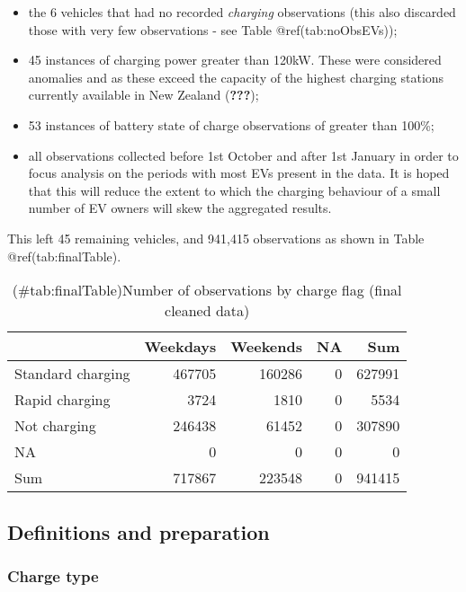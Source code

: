 \documentclass[]{article}
\providecommand{\tightlist}{%
  \setlength{\itemsep}{0pt}\setlength{\parskip}{0pt}}
\begin{document}
\begin{itemize}
\tightlist
\item
  the 6 vehicles that had no recorded \emph{charging} observations (this also discarded those with very few observations - see Table @ref(tab:noObsEVs));
\item
  45 instances of charging power greater than 120kW. These were considered anomalies and as these exceed the capacity of the highest charging stations currently available in New Zealand ({\textbf{???}});
\item
  53 instances of battery state of charge observations of greater than 100\%;
\item
  all observations collected before 1st October and after 1st January in order to focus analysis on the periods with most EVs present in the data. It is hoped that this will reduce the extent to which the charging behaviour of a small number of EV owners will skew the aggregated results.
\end{itemize}

This left 45 remaining vehicles, and 941,415 observations as shown in Table @ref(tab:finalTable).

\begin{table}[t]

\caption{(\#tab:finalTable)Number of observations by charge flag (final cleaned data)}
\centering
\begin{tabular}{l|r|r|r|r}
\hline
  & Weekdays & Weekends & NA & Sum\\
\hline
Standard charging & 467705 & 160286 & 0 & 627991\\
\hline
Rapid charging & 3724 & 1810 & 0 & 5534\\
\hline
Not charging & 246438 & 61452 & 0 & 307890\\
\hline
NA & 0 & 0 & 0 & 0\\
\hline
Sum & 717867 & 223548 & 0 & 941415\\
\hline
\end{tabular}
\end{table}

\hypertarget{definitions}{%
\subsection{Definitions and preparation}\label{definitions}}

\hypertarget{chargeType}{%
\subsubsection{Charge type}\label{chargeType}}
\end{document}
